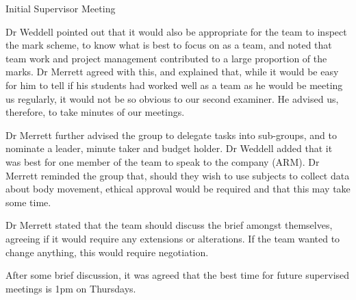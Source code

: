 \documentclass{article}
\begin{document}
\begin{Minutes}{Initial Supervisor Meeting}

Dr Weddell pointed out that it would also be appropriate for the team to
inspect the mark scheme, to know what is best to focus on as a team, and
noted that team work and project management contributed to a large
proportion of the marks. Dr Merrett agreed with this, and explained
that, while it would be easy for him to tell if his students had worked well as a team
as he would be meeting us regularly, it would not be so obvious to our
second examiner. He advised us, therefore, to take minutes of our meetings.

Dr Merrett further advised the group to delegate tasks into
sub-groups, and to nominate a leader, minute taker and budget holder. Dr
Weddell added that it was best for one member of the team to speak to
the company (ARM). Dr Merrett reminded the group that, should they wish to use
subjects to collect data about body movement, ethical approval would be
required and that this may take some time.


Dr Merrett stated that the team should discuss the brief amongst
themselves, agreeing if it would require any extensions or alterations. If the team
wanted to change anything, this would require negotiation.

After some brief discussion, it was agreed that the best
time for future supervised meetings is 1pm on Thursdays.


\end{Minutes}
\end{document}
